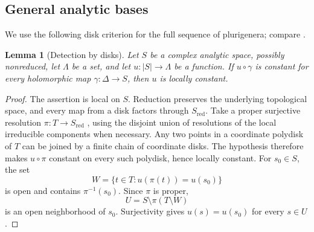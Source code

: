 \documentclass[11pt,a4paper]{article}
\numberwithin{equation}{section}
\newtheorem{lemma}[theorem]{Lemma}
\theoremstyle{definition}
\theoremstyle{remark}
\begin{document}
\subsection{General analytic bases}

We use the following disk criterion for the full sequence of
plurigenera; compare \cite[paragraph~13]{Kollar2021}.

\begin{lemma}[Detection by disks]\label{lem:disk-detection}
Let $S$ be a complex analytic space, possibly nonreduced, let
$\Lambda$ be a set, and let $u:|S|\to\Lambda$ be a function.
If $u\circ\gamma$ is constant for every holomorphic map
$\gamma:\Delta\to S$, then $u$ is locally constant.
\end{lemma}

\begin{proof}
The assertion is local on $S$. Reduction preserves the underlying
topological space, and every map from a disk factors through
$S_{\mathrm{red}}$. Take a proper surjective resolution
$\pi:T\to S_{\mathrm{red}}$
\cite[Theorem~13.3]{BM1997}, using the disjoint union of resolutions
of the local irreducible components when necessary.
Any two points in a coordinate polydisk of $T$ can be joined by a
finite chain of coordinate disks. The hypothesis therefore makes
$u\circ\pi$ constant on every such polydisk, hence locally constant.
For $s_0\in S$, the set
\[
 W=\{t\in T:u(\pi(t))=u(s_0)\}
\]
is open and contains $\pi^{-1}(s_0)$. Since $\pi$ is proper,
\[
 U=S\setminus\pi(T\setminus W)
\]
is an open neighborhood of $s_0$. Surjectivity gives
$u(s)=u(s_0)$ for every $s\in U$.
\end{proof}
\end{document}

